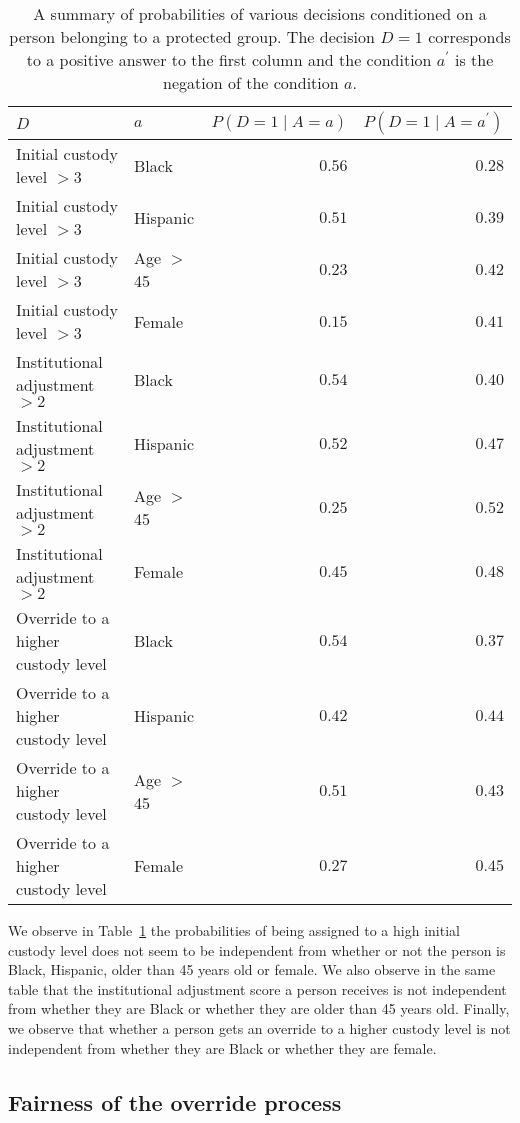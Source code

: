 \documentclass{amsproc}
\numberwithin{equation}{section}
\theoremstyle{plain}
\theoremstyle{remark}
\begin{document}
\begin{table}
\small
\begin{tabular}{|l|l||r|r|}\hline
 $D$ & $a$  & $P(D=1\mid A=a)$ & $P(D=1\mid A=a^\prime)$ \\\hline
Initial custody level $>3$ & Black & $0.56$ & $0.28$\\\hline
Initial custody level $>3$ & Hispanic & $0.51$ & $0.39$\\\hline
Initial custody level $>3$ & Age $>$ 45 & $0.23$ & $0.42$\\\hline
Initial custody level $>3$ & Female & $0.15$ & $0.41$\\\hline\hline
Institutional adjustment $>2$ & Black & $0.54$ & $0.40$\\\hline
Institutional adjustment $>2$ & Hispanic & $0.52$ & $0.47$\\\hline
Institutional adjustment $>2$ & Age $>$ 45 & $0.25$ & $0.52$\\\hline
Institutional adjustment $>2$ & Female & $0.45$ & $0.48$\\\hline\hline
Override to a higher custody level & Black & $0.54$ & $0.37$\\\hline
Override to a higher custody level & Hispanic & $0.42$ & $0.44$\\\hline
Override to a higher custody level & Age $>$ 45 & $0.51$ & $0.43$\\\hline
Override to a higher custody level & Female & $0.27$ & $0.45$\\\hline
\end{tabular}
\caption{A summary of probabilities of various decisions conditioned on a person belonging to a protected group.  The decision $D=1$ corresponds to a positive answer to the first column and the condition $a^\prime$ is the negation of the condition $a$.}\label{tbl:dd-fairness1}
\end{table}

We observe in Table~\ref{tbl:dd-fairness1} the probabilities of being assigned to a high initial custody level does not seem to be independent from whether or not the person is Black, Hispanic, older than 45 years old or female.  We also observe in the same table that the institutional adjustment score a person receives is not independent from whether they are Black or whether they are older than 45 years old.  Finally, we observe that whether a person gets an override to a higher custody level is not independent from whether they are Black or whether they are female.

\subsection{Fairness of the override process}
\end{document}
